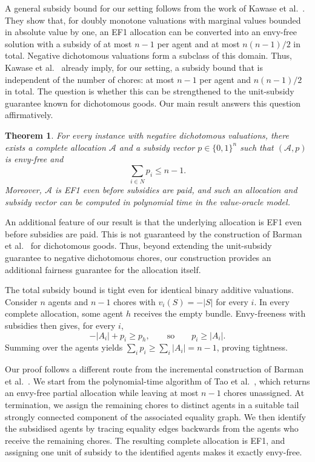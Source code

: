 \documentclass[sigconf,anonymous]{aamas}
\theoremstyle{acmplain}
\newtheorem*{theorem*}{Theorem}
\theoremstyle{acmdefinition}
\theoremstyle{acmplain}
\begin{document}
A general subsidy bound for our setting follows from the work of Kawase et al.~\cite{kawase2025towards}. They show that, for doubly monotone valuations with marginal values bounded in absolute value by one, an EF1 allocation can be converted into an envy-free solution with a subsidy of at most $n-1$ per agent and at most $n(n-1)/2$ in total. Negative dichotomous valuations form a subclass of this domain. Thus, Kawase et al.~\cite{kawase2025towards} already imply, for our setting, a subsidy bound that is independent of the number of chores: at most $n-1$ per agent and $n(n-1)/2$ in total. The question is whether this can be strengthened to the unit-subsidy guarantee known for dichotomous goods. Our main result answers this question affirmatively.

\begin{theorem*}
For every instance with negative dichotomous valuations, there exists a complete allocation $\mathcal A$ and a subsidy vector
$p\in\{0,1\}^n$ such that $(\mathcal A,p)$ is envy-free and
\[
    \sum_{i\in N} p_i\le n-1.
\]
Moreover, $\mathcal A$ is EF1 even before subsidies are paid, and such an allocation and subsidy vector can be computed in polynomial time in the value-oracle model.
\end{theorem*}
An additional feature of our result is that the underlying allocation is EF1 even before subsidies are paid. This is not guaranteed by the construction of Barman et al.~\cite{BKNS22} for dichotomous goods. Thus, beyond extending the unit-subsidy guarantee to negative dichotomous chores, our construction provides an additional fairness guarantee for the allocation itself.

The total subsidy bound is tight even for identical binary additive valuations. Consider $n$ agents and $n-1$ chores with $v_i(S)=-|S|$ for every $i$. In every complete allocation, some agent $h$ receives the empty bundle. Envy-freeness with subsidies then gives, for every $i$,
\[
    -|A_i|+p_i\ge p_h,
    \qquad\text{so}\qquad
    p_i\ge |A_i|.
\]
Summing over the agents yields
$\sum_i p_i\ge\sum_i|A_i|=n-1$, proving tightness.


Our proof follows a different route from the incremental construction of Barman et al.~\cite{BKNS22}. We start from the polynomial-time algorithm of Tao et al.~\cite{tao2025existence}, which returns an envy-free partial allocation while leaving at most $n-1$ chores unassigned. At termination, we assign the remaining chores to distinct agents in a suitable tail strongly connected component of the associated equality graph. We then identify the subsidised agents by tracing equality edges backwards from the agents who receive the remaining chores. The resulting complete allocation is EF1, and assigning one unit of subsidy to the identified agents makes it exactly envy-free.
\end{document}
